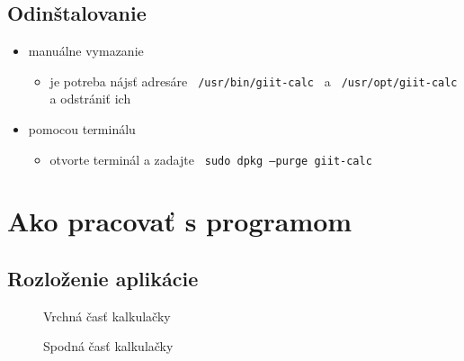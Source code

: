 \documentclass[a4paper, 11pt]{article}
\begin{document}
    \subsection{Odinštalovanie}
    \begin{itemize}
        \item manuálne vymazanie
        \begin{itemize}
            \item je potreba nájsť adresáre \texttt{ /usr/bin/giit-calc } a \texttt{ /usr/opt/giit-calc }a odstrániť ich
        \end{itemize}
        \item pomocou terminálu
        \begin{itemize}
            \item otvorte terminál a zadajte \texttt{ sudo dpkg --purge giit-calc }
        \end{itemize}
    \end{itemize}
    \newpage
    \section{Ako pracovať s programom}
    \subsection{Rozloženie aplikácie}
    \begin{figure}[!h]
        \centering
        \caption{Vrchná časť kalkulačky}
        \label{fig:obrazok1}
    \end{figure}
    
    \begin{figure}[!h]
        \centering
        \caption{Spodná časť kalkulačky}
        \label{fig:obrazok2}
    \end{figure}
    
\end{document}
